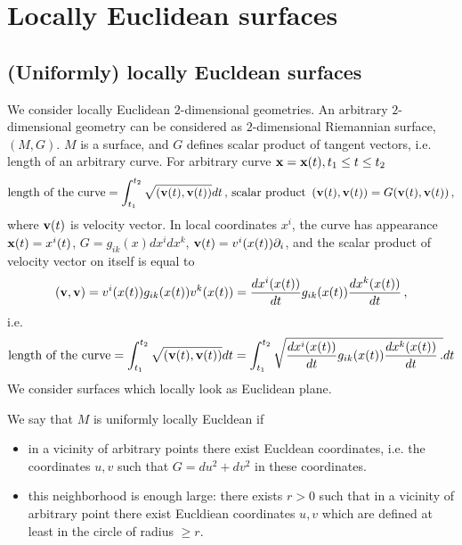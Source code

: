 \documentclass[12pt]{article}
\theoremstyle{definition}
\numberwithin{equation}{section}
\begin{document}
\tableofcontents

\section {Locally Euclidean surfaces}

\subsection 
{ (Uniformly) locally Eucldean surfaces}

  We consider locally Euclidean $2$-dimensional 
geometries.  An arbitrary $2$-dimensional  geometry 
can be considered as
$2$-dimensional  Riemannian surface, $(M,G)$.
$M$ is a surface, and $G$ defines scalar product of
tangent vectors, i.e. length of an arbitrary curve.
For arbitrary curve
  ${\bf x}={\bf x}(t), t_1\leq t\leq t_2$
             $$
 \hbox {length of the curve}=
   \int_{t_1}^{t_2} \sqrt{\left({\bf v}(t),{\bf v}(t)\right)}dt\,,\,
\hbox{scalar product}\,\,  
\left({\bf v}(t),{\bf v}(t)\right)=G({\bf v}(t),{\bf v}(t))\,, 
             $$
where ${\bf v}(t)$ is velocity vector. 
 In local coordinates $x^i$,
the curve has appearance  ${\bf x}(t)=x^i(t)$,
    $G=g_{ik}(x)dx^idx^k$,
  ${\bf v}(t)=v^i(x(t))\partial_i$,
and 
the scalar product of velocity vector on itself 
is equal to
      $$
\left({\bf v},{\bf v}\right)=
 v^i(x(t))g_{ik}(x(t))v^k(x(t))=
 {d x^i(x(t))\over dt}
   g_{ik}(x(t))
 {d x^k(x(t))\over dt}\,,
      $$
i.e.
      $$
 \hbox {length of the curve}=
   \int_{t_1}^{t_2} \sqrt{\left({\bf v}(t),{\bf v}(t)\right)}dt
      =
    \int_{t_1}^{t_2} \sqrt{
  {d x^i(x(t))\over dt}
   g_{ik}(x(t))
 {d x^k(x(t))\over dt} \,.   
             }dt
      $$
We consider surfaces which locally look as Euclidean plane.

We say that $M$ is uniformly locally Eucldean
if

\begin {itemize}

\item 
in a vicinity of arbitrary points there exist
 Eucldean coordinates, i.e. the coordinates  $u,v$
such that  $G=du^2+dv^2$ in these coordinates.


\item this  neighborhood is enough large:
there exists $r>0$ such that 
   in a vicinity of arbitrary point there exist
Eucldiean coordinates  $u,v$ which are  defined at least in
the circle of radius $\geq r$.

\end{itemize}
\end{document}
